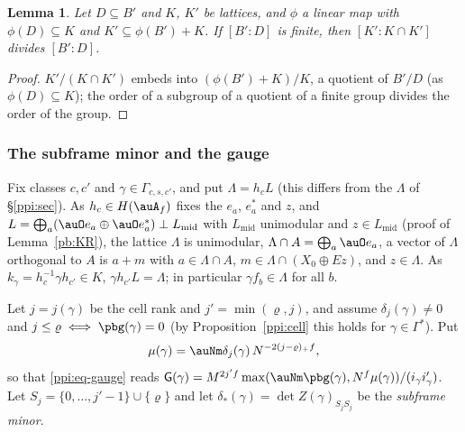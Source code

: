 \documentclass[10pt]{amsart}
\newtheorem{lemma}[theorem]{Lemma}
\theoremstyle{definition}
\theoremstyle{remark}
\begin{document}
\begin{lemma}\label{pbg:indexmap}
Let $D\subseteq B'$ and $K$, $K'$ be lattices, and $\phi$ a linear map with $\phi(D)\subseteq K$ and
$K'\subseteq\phi(B')+K$. If $[B':D]$ is finite, then $[K':K\cap K']$ divides $[B':D]$.
\end{lemma}
\begin{proof}
$K'/(K\cap K')$ embeds into $(\phi(B')+K)/K$, a quotient of $B'/D$ (as $\phi(D)\subseteq K$); the
order of a subgroup of a quotient of a finite group divides the order of the group.
\end{proof}

\subsubsection{The subframe minor and the gauge}\label{pbg:ss-minor}

Fix classes $c,c'$ and $\gamma\in\Gamma_{c,s,c'}$, and put $\Lambda=h_cL$ (this differs from the $\Lambda$ of \S\ref{ppi:sec}). As $h_c\in H(\auA_f)$ fixes
the $e_a$, $e_a^*$ and $z$, and $L=\bigoplus_a(\auO e_a\oplus\auO e_a^*)\perp L_{\mathrm{mid}}$ with
$L_{\mathrm{mid}}$ unimodular and $z\in L_{\mathrm{mid}}$ (proof of Lemma~\ref{pb:KR}), the lattice
$\Lambda$ is unimodular, $\Lambda\cap A=\bigoplus_a\auO e_a$, a vector of $\Lambda$ orthogonal to $A$
is $a+m$ with $a\in\Lambda\cap A$, $m\in\Lambda\cap(X_0\oplus Ez)$, and $z\in\Lambda$. As $k_\gamma=
h_c^{-1}\gamma h_{c'}\in K$, $\gamma h_{c'}L=\Lambda$; in particular $\gamma f_b\in\Lambda$ for all $b$.

Let $j=j(\gamma)$ be the cell rank and $j'=\min(\varrho,j)$, and assume $\delta_j(\gamma)\ne0$ and
$j\le\varrho\iff\pbg(\gamma)=0$ (by Proposition~\ref{ppi:cell} this holds for $\gamma\in\Gamma^*$). Put
\[
\mu(\gamma)=\auNm\delta_j(\gamma)\,N^{-2(j-\varrho)_+f},
\]
so that \eqref{ppi:eq-gauge} reads $\mathsf G(\gamma)=M^{2j'f}\max(\auNm\pbg(\gamma),N^f\mu(\gamma))/(
i_\gamma i'_\gamma)$. Let $S_j=\{0,\dots,j'-1\}\cup\{\varrho\}$ and let $\delta_*(\gamma)=\det Z(\gamma)_{
S_jS_j}$ be the \emph{subframe minor}.
\end{document}
